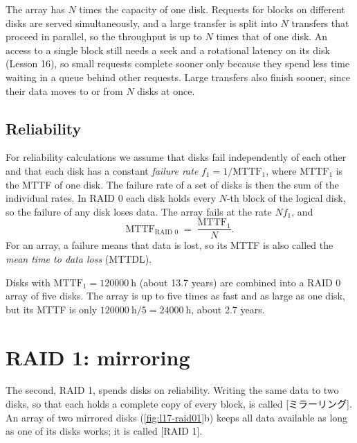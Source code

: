 \documentclass[../main.tex]{subfiles}
\begin{document}
The array has $N$ times the capacity of one disk.  Requests for blocks on
different disks are served simultaneously, and a large transfer is split
into $N$ transfers that proceed in parallel, so the throughput is up to $N$
times that of one disk.  An access to a single block still needs a seek and
a rotational latency on its disk (Lesson 16), so small requests complete
sooner only because they spend less time waiting in a queue behind other
requests.  Large transfers also finish sooner, since their data moves to or
from $N$ disks at once.

\subsection{Reliability}

For reliability calculations we assume that disks fail independently of each
other and that each disk has a constant \emph{failure rate}
$f_1 = 1/\mathrm{MTTF}_1$, where $\mathrm{MTTF}_1$ is the MTTF of one
disk.  The
failure rate of a set of disks is then the sum of the individual rates.  In
RAID 0 each disk holds every $N$-th block of the logical disk, so the failure
of any disk loses data.  The array fails at the rate $N f_1$, and
\begin{equation}
  \mathrm{MTTF}_{\text{RAID 0}} \;=\; \frac{\mathrm{MTTF}_1}{N} .
  \label{eq:l17-raid0}
\end{equation}
For an array, a failure means that data is lost, so its MTTF is also called
the \emph{mean time to data loss} (MTTDL).

\begin{example}
  \label{ex:l17-raid0}
  Disks with $\mathrm{MTTF}_1 = \SI{120000}{\hour}$ (about 13.7 years) are
  combined into a RAID 0 array of five disks.  The array is up to five times
  as fast and as large as one disk, but its MTTF is only
  $\SI{120000}{\hour}/5 = \SI{24000}{\hour}$, about 2.7 years.
\end{example}

\section{RAID 1: mirroring}
\label{sec:l17-raid1}

The second, RAID 1, spends disks on reliability.  Writing the same data to two disks, so that each
holds a complete copy of every block, is called
[ミラーリング].  An array of two mirrored disks
(\cref{fig:l17-raid01}b) keeps all data available as long as one of its
disks works; it is called [RAID 1].
\end{document}
